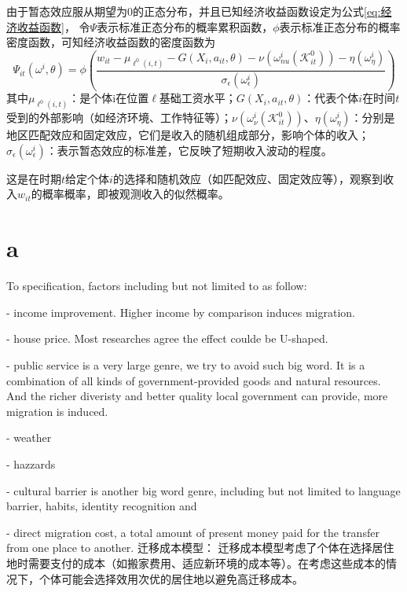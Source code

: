\documentclass[a4paper,12pt,oneside, fontset=mac]{ctexbook} %
\begin{document}
由于暂态效应服从期望为$0$的正态分布，并且已知经济收益函数设定为公式\ref{eq:经济收益函数}，
令$\Psi$表示标准正态分布的概率累积函数，$\phi$表示标准正态分布的概率密度函数，可知经济收益函数的密度函数为
\begin{equation}
  \Psi_{it}(\omega^{i},\theta)=\phi(\frac{w_{it} - \mu_{\ell^{0}(i,t)}-G(X_{i},a_{it},\theta)-\nu(\omega_{nu}^{i}(\mathcal{K}_{it}^{0}))-\eta(\omega_{\eta}^{i})  }{\sigma_{\epsilon}(\omega_{\epsilon}^{i})})
\end{equation}
其中$\mu_{\ell^{0}(i,t)}$：是个体i在位置$\ell$基础工资水平；$G(X_i, a_{it}, \theta)$：代表个体$i$在时间$t$受到的外部影响（如经济环境、工作特征等）；$\nu(\omega_{\nu}^i(\mathcal{K}_{it}^0))$、$\eta(\omega_{\eta}^i)$：分别是地区匹配效应和固定效应，它们是收入的随机组成部分，影响个体的收入；$\sigma_{\epsilon}(\omega_{\epsilon}^i)$：表示暂态效应的标准差，它反映了短期收入波动的程度。

这是在时期$t$给定个体$i$的选择和随机效应（如匹配效应、固定效应等），观察到收入$w_{it}$的概率概率，即被观测收入的似然概率。


\chapter{a}


To specification, factors including but not limited to as follow:

- income improvement. Higher income by comparison induces migration. 

- house price. Most researches agree the effect coulde be U-shaped.

- public service is a very large genre, we try to avoid such big word. It is a combination of all kinds of government-provided goods and natural resources. And the richer diveristy and better quality local government can provide, more migration is induced.

- weather

- hazzards

- cultural barrier is another big word genre, including but not limited to language barrier, habits, identity recognition and 

- direct migration cost, a total amount of present money paid for the transfer from one place to another. 迁移成本模型： 迁移成本模型考虑了个体在选择居住地时需要支付的成本（如搬家费用、适应新环境的成本等）。在考虑这些成本的情况下，个体可能会选择效用次优的居住地以避免高迁移成本。


\newpage


% 
\end{document}
